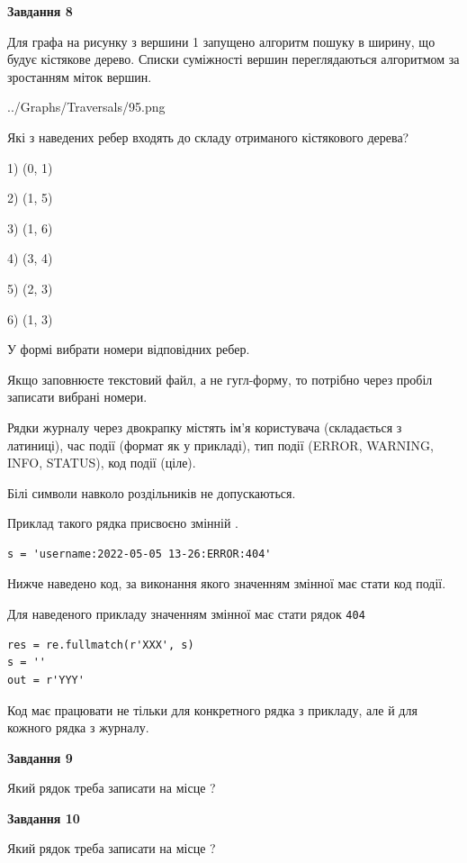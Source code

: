 \documentclass[12pt, ukrainian]{article}
\def\code#1{\Verb!#1!}
\begin{document}
{\begin {large}
{\begin {center}\textbf{Завдання 8}\end {center}}\par
Для графа на рисунку з вершини 1 запущено алгоритм пошуку в ширину, що будує кістякове дерево. Списки суміжності вершин переглядаються алгоритмом за зростанням міток вершин.\par
\begin{center}
	{../Graphs/Traversals/95.png}
\end{center}
\par Які з наведених ребер входять до складу отриманого кістякового дерева?\par
1) (0, 1)\par
2) (1, 5)\par
3) (1, 6)\par
4) (3, 4)\par
5) (2, 3)\par
6) (1, 3)\par
{\vskip 15pt} У формі вибрати номери відповідних ребер.


Якщо заповнюєте текстовий файл, а не гугл-форму, то потрібно через пробіл записа\-ти вибрані номери.\par
\newpage


Рядки журналу через двокрапку містять ім'я користувача (складається з латиниці), час події (фор\-мат як у прикладі), тип події (ERROR, WARNING, INFO, STATUS), код події (ціле).

Білі символи навколо роздільників не допускаються.

Приклад такого рядка присвоєно змінній .



\begin{verbatim}
s = 'username:2022-05-05 13-26:ERROR:404'
\end{verbatim}


Нижче наведено код, за виконання якого значенням змінної  має стати код події.

Для наведеного прикладу значенням змінної  має стати рядок \code{404}



\begin{verbatim}
res = re.fullmatch(r'XXX', s)
s = ''
out = r'YYY'
\end{verbatim}


Код має працювати не тільки для конкретного рядка з прикладу, але й для кожного рядка з журналу.

{\begin {center}\textbf{Завдання 9}\end {center}}\par
Який рядок треба записати на місце  ?\par
\vspace{5mm}


{\begin {center}\textbf{Завдання 10}\end {center}}\par
Який рядок треба записати на місце  ?\par


\newpage


\end {large}}
\end{document}
